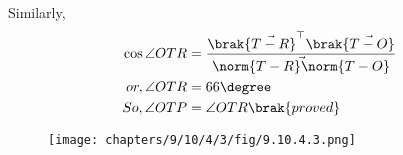 Similarly,
\begin{align}
   \cos{\angle OTR} &= \frac{\brak{\vec{T-R}}^{\top}\brak{\vec{T-O}}}{\vec{\norm{T-R}\norm{T-O}}}\\
or, \angle OTR&= 66\degree \\
So,\angle OTP &= \angle OTR \brak{proved}
\end{align}

 

\begin{figure}[H]                            
\centering
\texttt{[image: chapters/9/10/4/3/fig/9.10.4.3.png]}                            
\caption{}                              
\label{fig:9.10.4.3}
\end{figure}

